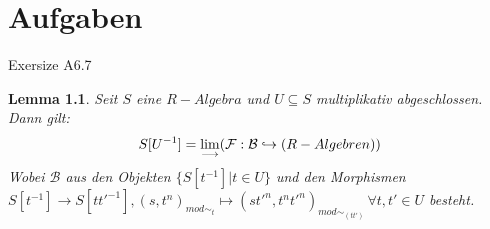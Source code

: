 \documentclass[10pt,a4paper]{report}
\newcommand{\comment}[1]{}
\newcounter{Aussage}[chapter]
\newtheorem{lemma}[Aussage]{Lemma}
\newcommand{\lok}[2]{#1 [#2^{-1}]}
\newcommand{\loke}[3]{(#1,#2)_{mod\sim_{#3}}}
\newcommand{\colimes}[0]{\lim\limits_{ \longrightarrow }}
\newcommand{\infunctionfront}[3]{\nolinebreak{#1:#2 \hookrightarrow #3}}
\begin{document}
\chapter{Aufgaben}
Exersize A6.7
\begin{lemma}\comment{\label{Lokalisierung als Colimes}}
Seit $S$ eine $R-Algebra$ und $U \subseteq S$ multiplikativ abgeschlossen.
Dann gilt:
\begin{gather*}
 S[U^{-1}] = \colimes (\infunctionfront{\mathcal{F}}{\mathcal{B}}{(R-Algebren)})
\end{gather*}
Wobei $\mathcal{B}$ aus den Objekten $\lbrace \lok{S}{t} \vert t \in U \rbrace$ und den Morphismen\\
$\lok{S}{t} \longrightarrow \lok{S}{tt'}, \loke{s}{t^n}{t} \longmapsto \loke{st'^n}{t^nt'^n}{(tt')} \,
\forall t,t' \in U$ besteht.\\
\end{lemma}
\end{document}
